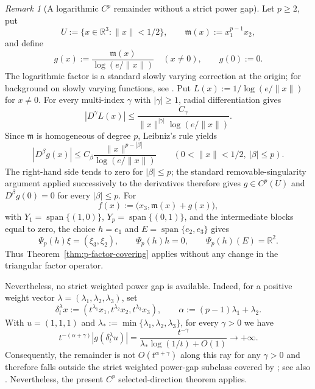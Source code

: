\documentclass[11pt]{amsart}
\theoremstyle{definition}
\theoremstyle{remark}
\newtheorem{remark}[theorem]{Remark}
\begin{document}
	
	\begin{remark}[A logarithmic $C^p$ remainder without a strict power gap]
		\label{rem:logarithmic-remainder}
		Let $p\ge2$, put
		$$
		U:=\{x\in\mathbb R^3:\|x\|<1/2\},
		\qquad
		\mathfrak m(x):=x_1^{p-1}x_2,
		$$
		and define
		$$
		g(x):=\frac{\mathfrak m(x)}{\log(e/\|x\|)}
		\quad (x\ne0),
		\qquad
		g(0):=0.
		$$
		The logarithmic factor is a standard slowly varying correction at the
		origin; for background on slowly varying functions, see
		\cite[Section~1.5]{BinghamGoldieTeugels}. Put
		$L(x):=1/\log(e/\|x\|)$ for $x\ne0$. For every multi-index $\gamma$
		with $|\gamma|\ge1$, radial differentiation gives
		$$
		|D^\gamma L(x)|
		\le
		\frac{C_\gamma}{\|x\|^{|\gamma|}\log(e/\|x\|)}.
		$$
		Since $\mathfrak m$ is homogeneous of degree $p$, Leibniz's rule yields
		$$
		|D^\beta g(x)|
		\le
		C_\beta\frac{\|x\|^{p-|\beta|}}{\log(e/\|x\|)}
		\qquad
		(0<\|x\|<1/2,\ |\beta|\le p).
		$$
		The right-hand side tends to zero for $|\beta|\le p$; the standard
		removable-singularity argument applied successively to the derivatives
		therefore gives $g\in C^p(U)$ and $D^\beta g(0)=0$ for every
		$|\beta|\le p$.
		For
		$$
		f(x):=\bigl(x_3,\mathfrak m(x)+g(x)\bigr),
		$$
		with $Y_1=\operatorname{span}\{(1,0)\}$,
		$Y_p=\operatorname{span}\{(0,1)\}$, and the intermediate blocks equal
		to zero, the choice $h=e_1$ and
		$E=\operatorname{span}\{e_2,e_3\}$ gives
		$$
		\Psi_p(h)\xi=(\xi_3,\xi_2),
		\qquad
		\Psi_p(h)h=0,
		\qquad
		\Psi_p(h)(E)=\mathbb R^2.
		$$
		Thus Theorem~\ref{thm:p-factor-covering} applies without any change in
		the triangular factor operator.
		
		Nevertheless, no strict weighted power gap is available. Indeed, for a
		positive weight vector $\lambda=(\lambda_1,\lambda_2,\lambda_3)$, set
		$$
		\delta_t^\lambda x
		:=
		(t^{\lambda_1}x_1,t^{\lambda_2}x_2,t^{\lambda_3}x_3),
		\qquad
		\alpha:=(p-1)\lambda_1+\lambda_2.
		$$
		With $u=(1,1,1)$ and
		$\lambda_*:=\min\{\lambda_1,\lambda_2,\lambda_3\}$, for every
		$\gamma>0$ we have
		$$
		t^{-(\alpha+\gamma)}
		|g(\delta_t^\lambda u)|
		=
		\frac{t^{-\gamma}}
		{\lambda_*\log(1/t)+O(1)}
		\longrightarrow+\infty.
		$$
		Consequently, the remainder is not
		$O(t^{\alpha+\gamma})$ along this ray for any $\gamma>0$ and therefore
		falls outside the strict weighted power-gap subclass covered by
		\cite[Theorem~3.2]{ArutyunovZhukovskiySbornik2025}; see also
		\cite{ArutyunovZhukovskiyMathNotes2025}. Nevertheless, the present $C^p$
		selected-direction theorem applies.
	\end{remark}
	
\end{document}
